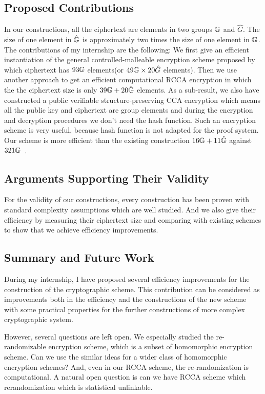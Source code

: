 \subsection*{Proposed Contributions}
In our constructions, all the ciphertext are elements in two groups $\mathbb{G}$ and $\hat{G}$.
The size of one element in $\hat{\mathbb{G}}$ is approximately two times the size of one element in $\mathbb{G}$.
The contributions of my internship are the following:
We first give an efficient instantiation of the general controlled-malleable encryption scheme proposed by~\cite{DBLP:conf/eurocrypt/ChaseKLM12} which ciphertext has $93\mathbb{G}$ elements(or $49\mathbb{G} \times 20\hat{G}$ elements).
Then we use another approach to get an efficient computational RCCA encryption in which the the ciphertext size is only $39\mathbb{G} + 20 \hat{\mathbb{G}}$ elements.
As a sub-result, we also have constructed a public verifiable structure-preserving CCA encryption which means all the public key and ciphertext are group elements and during the encryption and decryption procedures we don't need the hash function.
Such an encryption scheme is very useful, because hash function is not adapted for the proof system.
Our scheme is more efficient than the existing construction $16\mathbb{G} + 11\hat{\mathbb{G}}$ against $321\mathbb{G}$~\cite{DBLP:conf/pkc/AbeDKNO13}.

\subsection*{Arguments Supporting Their Validity}
For the validity of our constructions,
every construction has been proven with standard complexity assumptions which are well studied.
And we also give their efficiency by measuring their ciphertext size and comparing with existing schemes to show that we achieve efficiency improvements.

\subsection*{Summary and Future Work}
During my internship, I have proposed several efficiency improvements for the construction of the cryptographic scheme.
This contribution can be considered as improvements both in the efficiency and the constructions of the new scheme with some practical properties for the further constructions of more complex cryptographic system.

However, several questions are left open. 
We especially studied the re-randomizable encryption scheme, which is a subset of homomorphic encryption scheme.
Can we use the similar ideas for a wider class of homomorphic encryption schemes?
And, even in our RCCA scheme, the re-randomization is computational.
A natural open question is can we have RCCA scheme which rerandomization which is statistical unlinkable.

